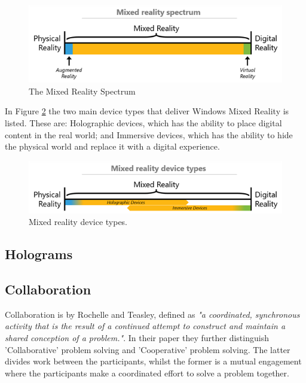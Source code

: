             \begin{figure}[!ht]
                \centering
                \includegraphics[scale=1]{figures/mixedrealityspectrum.png}
                \caption{The Mixed Reality Spectrum\cite{wdc-mr}}
                \label{fig:mrspectrum}
            \end{figure}
            
            In Figure \ref{fig:mrdevicetypes} the two main device types that deliver Windows Mixed Reality is listed. These are: Holographic devices, which has the ability to place digital content in the real world;\cite{wdc-mr} and Immersive devices, which has the ability to hide the physical world and replace it with a digital experience.\cite{wdc-mr} 
            \begin{figure}[!ht]
                \centering
                \includegraphics[scale=1]{figures/mixedrealityspectrumdevicetypes.png}
                \caption{Mixed reality device types.\cite{wdc-mr}}
                \label{fig:mrdevicetypes}
            \end{figure}
            
        \subsection{Holograms}
        
        \subsection{Collaboration}
            
            Collaboration is by Rochelle and Teasley, defined as \emph{"a coordinated, synchronous activity that is the result of a continued attempt to construct and maintain a shared conception of a problem."}\cite{Roschelle1995}. In their paper they further distinguish 'Collaborative' problem solving and 'Cooperative' problem solving. The latter divides work between the participants, whilst the former is a mutual engagement where the participants make a coordinated effort to solve a problem together. \cite{Roschelle1995}
            

